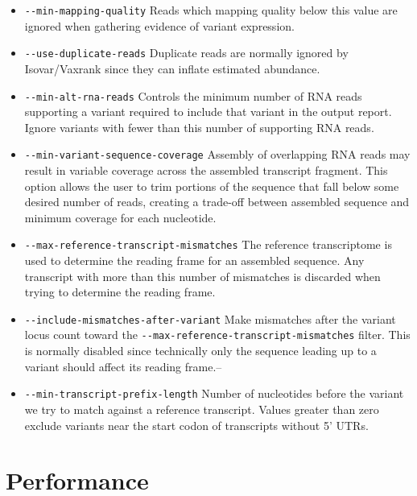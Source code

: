 \documentclass[10pt,letterpaper]{article}
\begin{document}
\begin{itemize}
    \item \verb|--min-mapping-quality| Reads which mapping quality below this value are ignored when gathering evidence of variant expression.

    \item \verb|--use-duplicate-reads| Duplicate reads are normally ignored by Isovar/Vaxrank since they can inflate estimated abundance.


    \item \verb|--min-alt-rna-reads| Controls the minimum number of RNA reads supporting a variant required to include that variant in the output report. Ignore variants with fewer than this number of supporting RNA reads.

    \item \verb|--min-variant-sequence-coverage| Assembly of overlapping RNA reads may result in variable coverage across the assembled transcript fragment. This option allows the user to trim portions of the sequence that fall below some desired number of reads, creating a trade-off between assembled sequence and minimum coverage for each nucleotide.

    \item \verb|--max-reference-transcript-mismatches| The reference transcriptome is used to determine the reading frame for an assembled sequence. Any transcript with more than this number of mismatches is discarded when trying to determine the reading frame.

    \item \verb|--include-mismatches-after-variant| Make mismatches after the variant locus count toward the \verb|--max-reference-transcript-mismatches|
    filter. This is normally disabled since technically only the sequence leading up to a variant should affect its reading frame.--


    \item \verb|--min-transcript-prefix-length| Number of nucleotides before the variant we try to match against a reference transcript. Values greater
    than zero exclude variants near the start codon of
    transcripts without 5' UTRs.
\end{itemize}

\section*{Performance}
\end{document}
